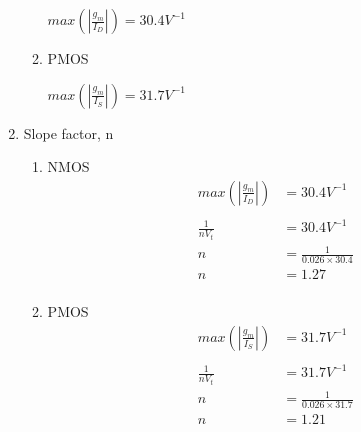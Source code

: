 \documentclass{article}
\begin{document}
\begin{enumerate}
\begin{enumerate}
\(max(|\frac{g_{m}}{I_{D}}|) = 30.4 V^{-1}\)
\item PMOS

\(max(|\frac{g_{m}}{I_{S}}|) = 31.7 V^{-1}\)
\end{enumerate}
\item Slope factor, n
\begin{enumerate}
\item NMOS
\begin{equation*}
\begin{aligned}
max(|\frac{g_{m}}{I_{D}}|) &= 30.4 V^{-1}\\\\
\frac{1}{nV_{t}} &= 30.4 V^{-1}\\
n &= \frac{1}{0.026 \times 30.4}\\
n &= 1.27 \\
\end{aligned}
\end{equation*}
\item PMOS
\begin{equation*}
\begin{aligned}
max(|\frac{g_{m}}{I_{S}}|) &= 31.7 V^{-1}\\\\
\frac{1}{nV_{t}} &= 31.7 V^{-1}\\
n &= \frac{1}{0.026 \times 31.7}\\
n &= 1.21 \\
\end{aligned}
\end{equation*}
\end{enumerate}
\end{enumerate}
\end{document}
